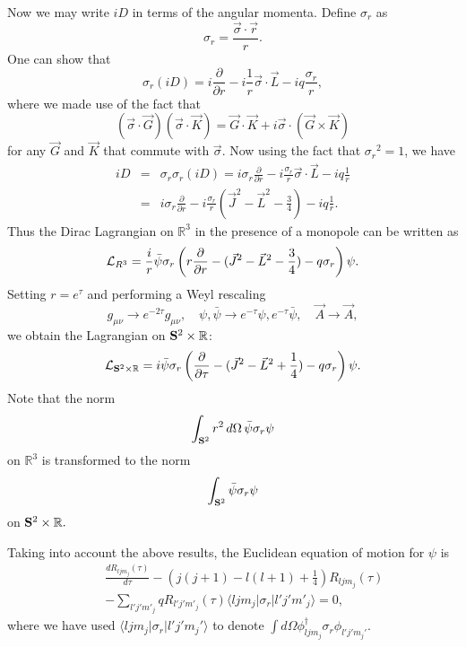\documentclass[a4paper,12pt, amsfonts, amssymb]{article}
\newcommand{\RR}{{\mathbb R}}
\newcommand{\ra}{\rightarrow}
\begin{document}
Now we may write $iD$ in terms of the angular momenta.
Define $\sigma_r$ as
\begin{equation*}
\sigma_r=\frac{\vec{\sigma}\cdot\vec{r}}{r}.
\end{equation*}
One can show that 
\begin{equation*}
\sigma_r (iD)=i\frac{\partial}{\partial 
r}-i\frac{1}{r}\vec{\sigma}\cdot\vec{L}-iq\frac{\sigma_r}{r},
\end{equation*}
where we made use of the fact that
\begin{equation*}
\left(\vec{\sigma}\cdot\vec{G}\right)\left(\vec{\sigma}\cdot\vec{K}\right) 
=\vec{G}\cdot\vec{K}+i\vec{\sigma}\cdot\left(\vec{G}\times\vec{K}\right)
\end{equation*}
for any $\vec{G}$ and $\vec{K}$ that commute with $\vec{\sigma}$.
Now using the fact that ${\sigma_r}^2=1$, we have
\begin{eqnarray}
iD&=&\sigma_r\sigma_r(iD)=i\sigma_r\frac{\partial}{\partial 
r}-i\frac{\sigma_r}{r}\vec{\sigma}\cdot\vec{L}-iq\frac{1}{r}\nonumber\\
&=&i\sigma_r\frac{\partial}{\partial r}-i\frac{\sigma_r}{r}({\vec{J}}^2 
-{\vec{L}}^2-\frac{3}{4})-iq\frac{1}{r}.\nonumber
\end{eqnarray}
Thus the Dirac Lagrangian on $\RR^3$ in the presence of a monopole
can be written as
$$
{\cal L}_{R^3}=\frac{i}{r}
{\bar{\psi}}\sigma_r\left(r\frac{\partial}{\partial r}
-(\vec{J}^2-\vec{L}^2-\frac34)-q\sigma_r\right)\psi. 
$$
Setting $r=e^\tau$ and performing a Weyl rescaling 
$$
g_{\mu\nu}\ra e^{-2\tau} g_{\mu\nu},\quad \psi,\bar{\psi}\to e^{-\tau}\psi, e^{-\tau}\bar{\psi},\quad \vec{A}\to\vec{A},
$$
we obtain the Lagrangian on ${\bf S}^2\times \RR$:
$$
{\cal L}_{{\bf S}^2\times \RR}=i\bar{\psi}\sigma_r\left(
\frac{\partial}{\partial\tau}-
(\vec{J}^2-\vec{L}^2+\frac14)-q\sigma_r\right)\psi.
$$
Note that the norm
$$
\int_{{\bf S}^2}\phantom{}r^2\, d\Omega\,\bar{\psi}\sigma_r\psi
$$
on $\RR^3$ is transformed to the norm
$$
\int_{{\bf S}^2}\phantom{}\bar{\psi}\sigma_r\psi
$$
on ${\bf S}^2\times \RR.$

Taking into account the above results, the Euclidean
equation of motion for $\psi$ is 
\begin{eqnarray}
&\ &
\frac{dR_{ljm_j}(\tau)}{d\tau}-\left(j(j+1)-l(l+1)
+\frac{1}{4}\right)R_{ljm_j}(\tau) \nonumber\\
&\ &- \sum_{l'j' m'_j}q R_{l'j'm'_j}(\tau)
\langle ljm_j\vert\sigma_r\vert l'j'm'_j\rangle  =0,\nonumber
\end{eqnarray}
where we have used $\langle ljm_j\vert\sigma_r\vert l'j'm_j'\rangle$ 
to denote $\int d\Omega \phi_{ljm_j}^\dagger\sigma_r\phi_{l'j'm_j'}.$
\end{document}
